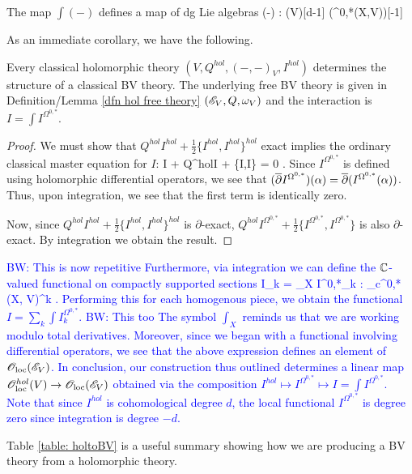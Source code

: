 \documentclass[10pt]{article}
\def\brian{\textcolor{blue}{BW: }\textcolor{blue}}
\begin{document}
\begin{lem}
The map $\int (-)$ defines a map of dg Lie algebras
\ben
\int(-) : \olochol(V)[d-1] \to \oloc(\Omega^{0,*}(X,V))[-1]
\een
\end{lem}

As an immediate corollary, we have the following.

\begin{cor} Every classical holomorphic theory $(V, Q^{hol},(-,-)_V, I^{hol})$ determines the structure of a classical BV theory.
The underlying free BV theory is given in Definition/Lemma \ref{dfn hol free theory} $(\mathscr E_V, Q, \omega_V)$ and the interaction is $I = \int I^{\Omega^{0,*}}$. 
\end{cor}

\begin{proof}
We must show that $Q^{hol}I^{hol} + \frac{1}{2} \{I^{hol},I^{hol}\}^{hol}$ exact implies the ordinary classical master equation for $I$:
\ben
\dbar I + Q^{hol}I +  \{I,I\} = 0 .
\een
Since $I^{\Omega^{0,*}}$ is defined using holomorphic differential operators, we see that $(\overline{\partial} I^{\Omega^{0,*}} ) (\alpha) = \overline{\partial} (I^{\Omega^{0,*}} (\alpha))$. 
Thus, upon integration, we see that the first term is identically zero.

Now, since $Q^{hol}I^{hol} + \frac{1}{2} \{I^{hol},I^{hol}\}^{hol}$ is $\partial$-exact, $Q^{hol}I^{\Omega^{0,*}} + \frac{1}{2} \{I^{\Omega^{0,*}},I^{\Omega^{0,*}}\}$ is also $\partial$-exact.
By integration we obtain the result.
\end{proof}

\brian{This is now repetitive
Furthermore, via integration we can define the $\mathbb C$-valued functional on compactly supported sections
\ben
I_k = \int_X I^{0,*}_k : \Omega_c^{0,*}(X, V)^{\tensor k} \to \CC .
\een
Performing this for each homogenous piece, we obtain the functional $I = \sum_k \int I^{\Omega^{0,*}}_k$. 
}
\brian{This too
The symbol $\int_X$ reminds us that we are working modulo total derivatives.
Moreover, since we began with a functional involving differential operators, we see that the above expression defines an element of ${\mathscr O}_{\rm loc}(\mathscr E_V)$. 
In conclusion, our construction thus outlined determines a linear map $\mathscr O_{\rm loc}^{hol}(V) \to {\mathscr O}_{\rm loc}(\mathscr E_V)$ obtained via the composition $I^{hol} \mapsto I^{\Omega^{0,*}} \mapsto I = \int I^{\Omega^{0,*}}$. 
Note that since $I^{hol}$ is cohomological degree $d$, the local functional $I^{\Omega^{0,*}}$ is degree zero since integration is degree $-d$. 
}

Table \ref{table: holtoBV} is a useful summary showing how we are producing a BV theory from a holomorphic theory.
\end{document}
